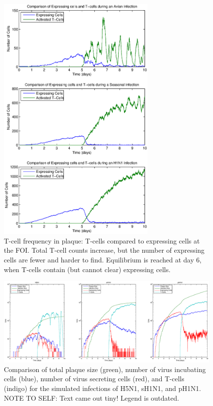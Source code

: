 \documentclass[10pt]{article}
\begin{document}
\begin{figure}[ht!]
\begin{center}
 \includegraphics[width=0.7\textwidth]{searcharea}
 \end{center}
\caption{T-cell frequency in plaque: T-cells compared to expressing cells at the FOI.  Total  T-cell counts increase, but the number of expressing cells are fewer and harder to find.  Equilibrium is reached at day 6, when T-cells contain (but cannot clear) expressing cells. } 
 \label{fig:searcharea}
\end{figure}


\begin{figure}[ht!]
\begin{center}
 \includegraphics[width=\textwidth]{plaquesize}
 \end{center}
\caption{Comparison of total plaque size (green), number of virus incubating cells (blue), number of virus secreting cells (red), and T-cells (indigo) for the simulated infections of H5N1, sH1N1, and pH1N1.  NOTE TO SELF: Text came out tiny!  Legend is outdated.} 
 \label{fig:plaquesize}
\end{figure}
\end{document}
